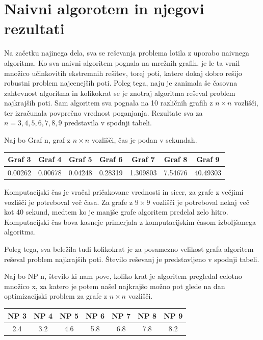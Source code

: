 \documentclass[a4paper, 12 pt]{article}
\theoremstyle{definition} %
\theoremstyle{plain} %
\theoremstyle{definition}
\begin{document}
\section{Naivni algorotem in njegovi rezultati}

Na začetku najinega dela, sva se reševanja problema lotila z uporabo naivnega algoritma. Ko sva naivni algoritem pognala na mrežnih grafih, je le ta vrnil množico učinkovitih ekstremnih rešitev, torej poti, katere dokaj dobro rešijo robustni problem najcenejših poti. Poleg tega, naju je zanimala še časovna zahtevnost algoritma in kolikokrat se je znotraj algoritma reševal problem najkrajših poti.
Sam algoritem sva pognala na 10 različnih grafih z $n \times n$ vozlišči, ter izračunala povprečno vrednost poganjanja. Rezultate sva za $n = 3, 4, 5, 6, 7, 8, 9$ predstavila v spodnji tabeli.\newline


Naj bo Graf n, graf z $n \times n$ vozlišči, čas je podan v sekundah.

\begin{center}
 \begin{tabular}{||c c c c c c c||} 
 \hline
Graf 3 & Graf 4 & Graf 5 & Graf 6 & Graf 7 & Graf 8 & Graf 9 \\ 
 \hline
\hline
 0.00262 & 0.00678 & 0.04248& 0.28319 & 1.309803&7.54676 & 40.49303\\ 
 \hline
\end{tabular}
\end{center}

Komputacijski čas je vračal pričakovane vrednosti in sicer, za grafe z večjimi vozlišči je potreboval več časa. Za grafe z $9 \times 9$ vozlišči je potreboval nekaj več kot 40 sekund, medtem ko je manjše grafe algoritem predelal zelo hitro. Komputacijski čas bova kasneje primerjala z komputacijskim časom izboljšanega algoritma.\newline

Poleg tega, sva beležila tudi kolikokrat je za posamezno velikost grafa algoritem reševal problem najkrajših poti. Število reševanj je predstavljeno v spodnji tabeli.\newline

\bigskip
Naj bo NP n, število ki nam pove, koliko krat je algoritem pregledal celotno množico x, za katero je potem našel najkrajšo možno pot glede na dan optimizacijski problem za grafe z $n \times n$ vozlišči.
\begin{center}
 \begin{tabular}{||c c c c c c c||} 
 \hline
 NP 3 &  NP 4 &  NP 5 &  NP 6 &  NP 7 &  NP 8 &  NP 9 \\ 
 \hline
\hline
2.4 & 3.2 & 4.6 & 5.8 & 6.8 & 7.8 &  8.2\\ 
 \hline
\end{tabular}
\end{center}
\end{document}
